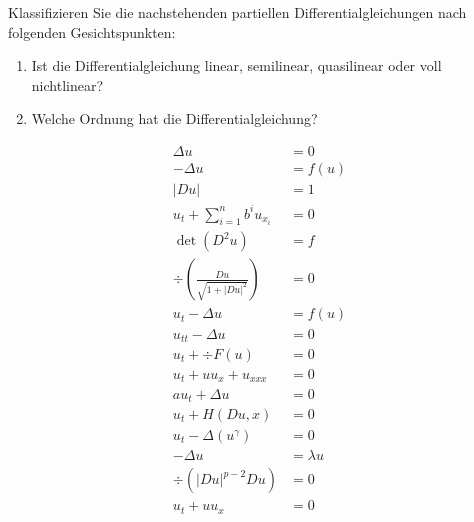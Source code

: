 \begin{exercisePage}
	\begin{zusatz}
		Klassifizieren Sie die nachstehenden partiellen Differentialgleichungen nach folgenden Gesichtspunkten:
		\begin{enumerate}[nolistsep, topsep=-\parskip]
			\item Ist die Differentialgleichung linear, semilinear, quasilinear oder voll nichtlinear?
			\item Welche Ordnung hat die Differentialgleichung?
		\end{enumerate}
		\begin{align*}
			\Delta u &=0\\
			-\Delta u &=f(u)\\
			|Du|&=1\\
			u_t + \sum_{i=1}^n b^i u_{x_i}&=0\\
			\det (D^2u) &=f\\
			\div \left( \frac{Du}{\sqrt{1+|Du|^2}} \right)&=0\\
			u_t-\Delta u &= f(u)\\
			u_{tt} - \Delta u&=0\\
			u_t + \div F(u)&=0 \\
			u_t + u u_x + u_{xxx} &=0 \\
			a u_t + \Delta u&=0\\
			u_t + H(Du,x)&=0\\
			u_t - \Delta (u^\gamma)&=0\\
			-\Delta u &= \lambda u \\
			\div(|Du|^{p-2}Du)&=0\\
			u_t + uu_x&=0
		\end{align*}
	\end{zusatz}
	
\end{exercisePage}